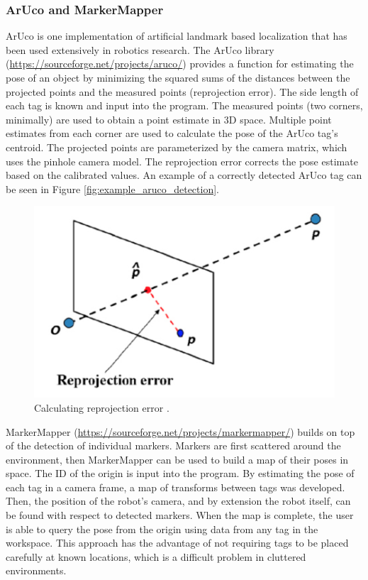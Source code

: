 \documentclass{article}
\begin{document}
    \subsubsection{ArUco and MarkerMapper}

      ArUco is one implementation of artificial landmark based localization that has been used extensively in robotics research. The ArUco library (\url{https://sourceforge.net/projects/aruco/}) provides a function for estimating the pose of an object by minimizing the squared sums of the distances between the projected points and the measured points (reprojection error). The side length of each tag is known and input into the program. The measured points (two corners, minimally) are used to obtain a point estimate in 3D space. Multiple point estimates from each corner are used to calculate the pose of the ArUco tag's centroid. The projected points are parameterized by the camera matrix, which uses the pinhole camera model. The reprojection error corrects the pose estimate based on the calibrated values. An example of a correctly detected ArUco tag can be seen in Figure \ref{fig:example_aruco_detection}.

      \begin{figure}[H]
        \centering
        \includegraphics[width=0.5\linewidth]{./images/reprojection_img.png}
        \caption{Calculating reprojection error \cite{richard_hartley_multiple_2003}.}
        \label{fig:reprojection_img}
      \end{figure}

      MarkerMapper (\url{https://sourceforge.net/projects/markermapper/}) builds on top of the detection of individual markers. Markers are first scattered around the environment, then MarkerMapper can be used to build a map of their poses in space. The ID of the origin is input into the program. By estimating the pose of each tag in a camera frame, a map of transforms between tags was developed. Then, the position of the robot's camera, and by extension the robot itself, can be found with respect to detected markers. When the map is complete, the user is able to query the pose from the origin using data from any tag in the workspace. This approach has the advantage of not requiring tags to be placed carefully at known locations, which is a difficult problem in cluttered environments.
\end{document}
